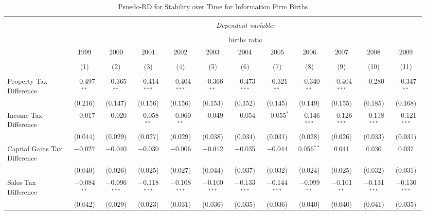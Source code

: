 
\begin{table}[!htbp] \centering 
  \caption{Psuedo-RD for Stability over Time for  Information Firm Births} 
  \label{} 
\begin{tabular}{@{\extracolsep{5pt}}lccccccccccc} 
\\[-1.8ex]\hline 
\hline \\[-1.8ex] 
 & \multicolumn{11}{c}{\textit{Dependent variable:}} \\ 
\cline{2-12} 
\\[-1.8ex] & \multicolumn{11}{c}{births ratio} \\ 
 & 1999 & 2000 & 2001 & 2002 & 2003 & 2004 & 2005 & 2006 & 2007 & 2008 & 2009 \\ 
\\[-1.8ex] & (1) & (2) & (3) & (4) & (5) & (6) & (7) & (8) & (9) & (10) & (11)\\ 
\hline \\[-1.8ex] 
 Property Tax Difference & $-$0.497$^{**}$ & $-$0.365$^{**}$ & $-$0.414$^{***}$ & $-$0.404$^{***}$ & $-$0.366$^{**}$ & $-$0.473$^{***}$ & $-$0.321$^{**}$ & $-$0.340$^{**}$ & $-$0.404$^{***}$ & $-$0.280 & $-$0.347$^{**}$ \\ 
  & (0.216) & (0.147) & (0.156) & (0.156) & (0.153) & (0.152) & (0.145) & (0.149) & (0.155) & (0.185) & (0.168) \\ 
  Income Tax Difference & $-$0.017 & $-$0.020 & $-$0.058$^{**}$ & $-$0.060$^{**}$ & $-$0.049 & $-$0.054 & $-$0.055$^{*}$ & $-$0.146$^{***}$ & $-$0.126$^{***}$ & $-$0.118$^{***}$ & $-$0.121$^{***}$ \\ 
  & (0.044) & (0.029) & (0.027) & (0.029) & (0.038) & (0.034) & (0.031) & (0.028) & (0.026) & (0.033) & (0.031) \\ 
  Capital Gains Tax Difference & $-$0.027 & $-$0.040 & $-$0.030 & $-$0.006 & $-$0.012 & $-$0.035 & $-$0.044 & 0.056$^{**}$ & 0.041 & 0.030 & 0.037 \\ 
  & (0.040) & (0.026) & (0.025) & (0.027) & (0.044) & (0.037) & (0.032) & (0.024) & (0.025) & (0.032) & (0.031) \\ 
  Sales Tax Difference & $-$0.084$^{**}$ & $-$0.096$^{***}$ & $-$0.118$^{***}$ & $-$0.108$^{***}$ & $-$0.100$^{***}$ & $-$0.133$^{***}$ & $-$0.144$^{***}$ & $-$0.099$^{**}$ & $-$0.101$^{**}$ & $-$0.131$^{***}$ & $-$0.130$^{***}$ \\ 
  & (0.042) & (0.029) & (0.023) & (0.031) & (0.036) & (0.035) & (0.036) & (0.040) & (0.040) & (0.041) & (0.035) \\ 

\end{tabular}
\end{table}
